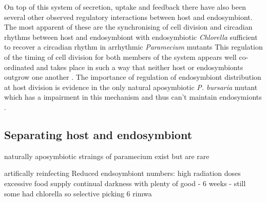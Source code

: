 On top of this system of secretion, uptake and feedback there have also been several other observed regulatory interactions between host and endosymbiont.  
The most apparent of these are the synchronising of cell division and circadian rhythms between host and endosymbiont with endosymbiotic \textit{Chlorella} sufficient to recover a circadian rhythm in arrhythmic \textit{Paramecium} mutants \citep{Miwa2009}
This regulation of the timing of cell division for both members of the system appears well co-ordinated and takes place in such a way that neither host or endosymbionts outgrow one another \citep{Kadono2004,Takahashi2007}.
The importance of regulation of endosymbiont distribution at host division is evidence in the only natural aposymbiotic \textit{P. bursaria} mutant which
has a impairment in this mechanism and thus can't maintain endosymionts \citep{Tonooka2002}. %


\subsection{Separating host and endosymbiont}

naturally aposymbiotic straings of paramecium exist but are rare

artifically reinfecting \citep{Ohkawa2011}
Reduced endsoymbiont numbers:
high radiation doses
excessive food supply
continual darkness with plenty of good - 6 weeks - still some had chlorella so selective picking 6 rimwa  




